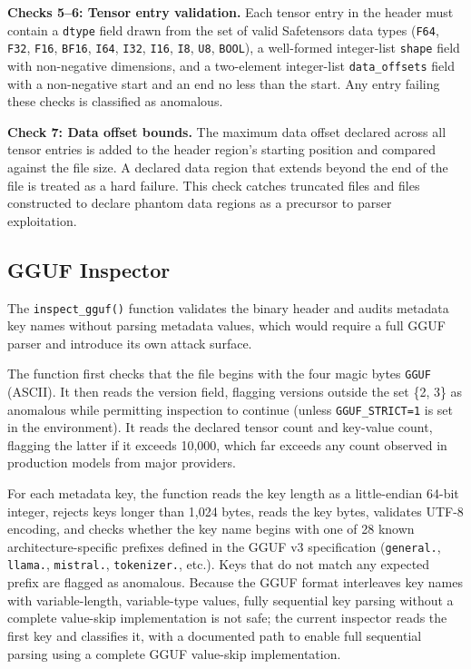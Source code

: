 \documentclass[sigconf,review]{acmart}
\begin{document}
\textbf{Checks 5--6: Tensor entry validation.} Each tensor entry in the
header must contain a \texttt{dtype} field drawn from the set of valid
Safetensors data types (\texttt{F64}, \texttt{F32}, \texttt{F16},
\texttt{BF16}, \texttt{I64}, \texttt{I32}, \texttt{I16}, \texttt{I8},
\texttt{U8}, \texttt{BOOL}), a well-formed integer-list \texttt{shape} field
with non-negative dimensions, and a two-element integer-list
\texttt{data\_offsets} field with a non-negative start and an end no less
than the start. Any entry failing these checks is classified as anomalous.

\textbf{Check 7: Data offset bounds.} The maximum data offset declared
across all tensor entries is added to the header region's starting position
and compared against the file size. A declared data region that extends
beyond the end of the file is treated as a hard failure. This check catches
truncated files and files constructed to declare phantom data regions as a
precursor to parser exploitation.

\subsection{GGUF Inspector}

The \texttt{inspect\_gguf()} function validates the binary header and
audits metadata key names without parsing metadata values, which would
require a full GGUF parser and introduce its own attack surface.

The function first checks that the file begins with the four magic bytes
\texttt{GGUF} (ASCII). It then reads the version field, flagging versions
outside the set \{2, 3\} as anomalous while permitting inspection to
continue (unless \texttt{GGUF\_STRICT=1} is set in the environment). It
reads the declared tensor count and key-value count, flagging the latter
if it exceeds 10,000, which far exceeds any count observed in production
models from major providers.

For each metadata key, the function reads the key length as a
little-endian 64-bit integer, rejects keys longer than 1,024 bytes, reads
the key bytes, validates UTF-8 encoding, and checks whether the key name
begins with one of 28 known architecture-specific prefixes defined in the
GGUF v3 specification (\texttt{general.}, \texttt{llama.},
\texttt{mistral.}, \texttt{tokenizer.}, etc.). Keys that do not match any
expected prefix are flagged as anomalous. Because the GGUF format
interleaves key names with variable-length, variable-type values, fully
sequential key parsing without a complete value-skip implementation is not
safe; the current inspector reads the first key and classifies it, with a
documented path to enable full sequential parsing using a complete
GGUF value-skip implementation.
\end{document}
